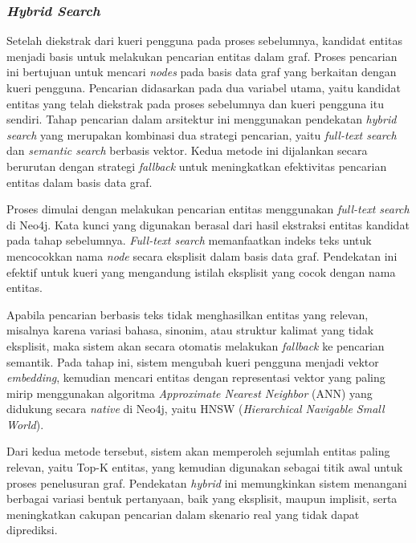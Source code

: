 \subsubsection{\textit{Hybrid Search}}
Setelah diekstrak dari kueri pengguna pada proses sebelumnya, kandidat entitas menjadi basis untuk melakukan pencarian entitas dalam graf.
Proses pencarian ini bertujuan untuk mencari \textit{nodes} pada basis data graf yang berkaitan dengan kueri pengguna.
Pencarian didasarkan pada dua variabel utama, yaitu kandidat entitas yang telah diekstrak pada proses sebelumnya dan kueri pengguna itu sendiri.
Tahap pencarian dalam arsitektur ini menggunakan pendekatan \textit{hybrid search} yang merupakan kombinasi dua strategi pencarian, yaitu \textit{full-text search} dan \textit{semantic search} berbasis vektor.
Kedua metode ini dijalankan secara berurutan dengan strategi \textit{fallback} untuk meningkatkan efektivitas pencarian entitas dalam basis data graf.

Proses dimulai dengan melakukan pencarian entitas menggunakan \textit{full-text search} di Neo4j.
Kata kunci yang digunakan berasal dari hasil ekstraksi entitas kandidat pada tahap sebelumnya.
\textit{Full-text search} memanfaatkan indeks teks untuk mencocokkan nama \textit{node} secara eksplisit dalam basis data graf.
Pendekatan ini efektif untuk kueri yang mengandung istilah eksplisit yang cocok dengan nama entitas.

Apabila pencarian berbasis teks tidak menghasilkan entitas yang relevan, misalnya karena variasi bahasa, sinonim, atau struktur kalimat yang tidak eksplisit, maka sistem akan secara otomatis melakukan \textit{fallback} ke pencarian semantik.
Pada tahap ini, sistem mengubah kueri pengguna menjadi vektor \textit{embedding}, kemudian mencari entitas dengan representasi vektor yang paling mirip menggunakan algoritma \textit{Approximate Nearest Neighbor} (ANN) yang didukung secara \textit{native} di Neo4j, yaitu HNSW (\textit{Hierarchical Navigable Small World}).

Dari kedua metode tersebut, sistem akan memperoleh sejumlah entitas paling relevan, yaitu Top-K entitas, yang kemudian digunakan sebagai titik awal untuk proses penelusuran graf.
Pendekatan \textit{hybrid} ini memungkinkan sistem menangani berbagai variasi bentuk pertanyaan, baik yang eksplisit, maupun implisit, serta meningkatkan cakupan pencarian dalam skenario real yang tidak dapat diprediksi.

